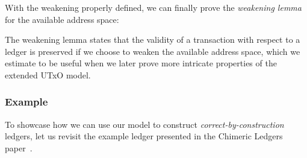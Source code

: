\documentclass[acmsmall,nonacm=true,screen=true]{acmart}
\begin{document}
With the weakening properly defined, we can finally prove the \textit{weakening lemma} for the available address space:

\UTXOweakenLemma{}
The weakening lemma states that the validity of a transaction with respect to a ledger is preserved if
we choose to weaken the available address space, which we estimate to be useful when we later prove more 
intricate properties of the extended UTxO model.

\subsubsection{Example} \label{subsec:utxo-example}
To showcase how we can use our model to construct \textit{correct-by-construction} ledgers,
let us revisit the example ledger presented in the Chimeric Ledgers paper~\cite{chimeric}.
\end{document}

